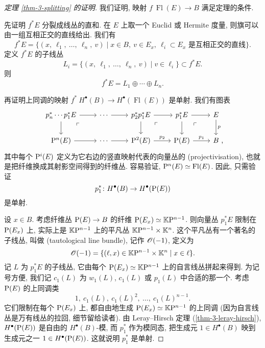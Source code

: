 \begin{proof}[定理 \ref{thm-3-splitting} 的证明]
    我们证明, 映射 $f \: \operatorname{Fl}(E) \to B$
    满足定理的条件.

    先证明 $f^* E$ 分裂成线丛的直和.
    在 $E$ 上取一个 Euclid 或 Hermite 度量,
    则旗可以由一组互相正交的直线给出. 我们有
    \[ f^* E = \{ 
        (x,\ \ell_1,\ \dotsc,\ \ell_n,\ v) \mid 
        x \in B,\ v \in E_x,\ \ell_i \subset E_x \text{ 是互相正交的直线}
    \}. \]
    定义 $f^* E$ 的子线丛
    \[ L_i = \{
        (x,\ \ell_1,\ \dotsc,\ \ell_n,\ v) \mid v \in \ell_i
    \} \subset f^* E. \]
    则
    \[ f^* E = L_1 \oplus \cdots \oplus L_n. \]

    再证明上同调的映射
    $f^* \: H^\bullet (B) \to H^\bullet (\operatorname{Fl}(E))$ 是单射.
    我们有图表
    \[ \begin{tikzcd}
        p_n^* \cdots p_1^* E \ar[d] \ar[r] \ar[dr, phantom, pos=.25, "\ulcorner"] &
        \cdots \ar[r] &
        p_2^* p_1^* E \ar[d] \ar[r] \ar[dr, phantom, pos=.25, "\ulcorner"] &
        p_1^* E \ar[d] \ar[r] \ar[dr, phantom, pos=.25, "\ulcorner"] &
        E \ar[d, "p"] \\ 
        \upP^n (E) \ar[r] &
        \cdots \ar[r] &
        \upP^2 (E) \ar[r, "p_2"] &
        \upP (E) \ar[r, "p_1"] &
        B \rlap{\ ,}
    \end{tikzcd} \]
    其中每个 $\mathrm{P}^i (E)$ 定义为它右边的竖直映射代表的向量丛的 (projectivisation),
    也就是把纤维换成其射影空间得到的纤维丛.
    容易验证, $\mathrm{P}^n (E) \simeq \operatorname{Fl} (E)$. 因此, 只需验证
    \[ p_1^* \colon H^\bullet (B) \to H^\bullet (\mathrm{P} (E)) \]
    是单射.

    设 $x \in B$. 考虑纤维丛 $\mathrm{P} (E) \to B$ 的纤维
    $\mathrm{P} (E_x) \simeq \mathbb{K} \mathrm{P}^{n - 1}$.
    则向量丛 $p_1^* E$ 限制在 $\mathrm{P} (E_x)$ 上,
    实际上是 $\mathbb{K} \mathrm{P}^{n - 1}$ 上的平凡丛 $\mathbb{K} \mathrm{P}^{n - 1} \times \mathbb{K}^n$.
    这个平凡丛有一个著名的子线丛, 叫做 (tautological line bundle),
    记作 $\mathscr{O} (-1)$, 定义为
    \[ \mathscr{O} (-1) = \{ 
        (\ell, x) \in \mathbb{K} \mathrm{P}^{n-1} \times \mathbb{K}^n \mid 
        x \in \ell
    \}. \]
    记 $L$ 为 $p_1^* E$ 的子线丛,
    它由每个 $\mathrm{P} (E_x) \simeq \mathbb{K} \mathrm{P}^{n - 1}$ 上的自言线丛拼起来得到.
    为记号方便, 我们记 $c_1 (L)$ 为 $w_1 (L)$, $c_1 (L)$ 或 $p_1 (L)$ 中合适的那一个.
    考虑 $\mathrm{P} (E)$ 的上同调类
    \[ 1,\ c_1(L),\ c_1(L)^2,\ \dotsc,\ c_1(L)^{n - 1}. \]
    它们限制在每个 $\mathrm{P} (E_x)$ 上,
    都自由地生成 $\mathrm{P} (E_x) \simeq \mathbb{K} \mathrm{P}^{n-1}$ 的上同调
    (因为自言线丛是万有线丛的拉回, 细节留给读者).
    由 Leray--Hirsch 定理 (\ref{thm-3-leray-hirsch}),
    $H^\bullet (\mathrm{P} (E))$ 是自由的 $H^\bullet (B)$-模,
    而 $p_1^*$ 作为模同态, 把生成元 $1 \in H^\bullet (B)$
    映到生成元之一 $1 \in H^\bullet (\mathrm{P} (E))$.
    这就说明 $p_1^*$ 是单射.
\end{proof}

